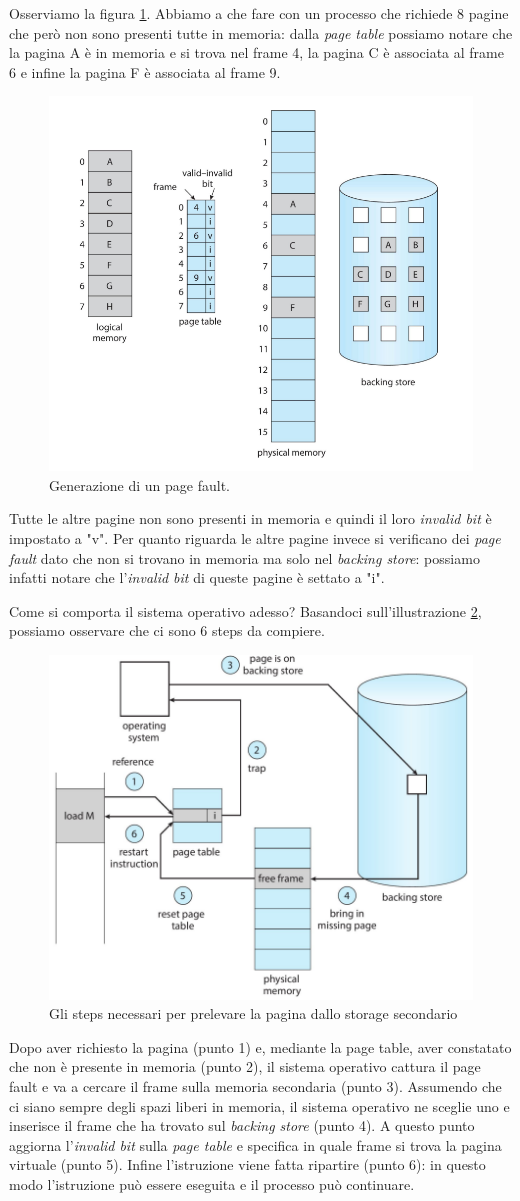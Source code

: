 Osserviamo la figura \ref{fig:page_fault}. Abbiamo a che fare con un processo che richiede 8 pagine che però non sono presenti tutte in memoria: dalla \textit{page table} possiamo notare che la pagina A è in memoria e si trova nel frame 4, la pagina C è associata al frame 6 e infine la pagina F è associata al frame 9. 
\begin{figure}[h]
    \centering
    \includegraphics[width = .50\textwidth]{../res/imgs/virtual memory/page_fault.png}
    \caption{Generazione di un page fault.}
    \label{fig:page_fault}
\end{figure}
Tutte le altre pagine non sono presenti in memoria e quindi il loro \textit{invalid bit} è impostato a "v". Per quanto riguarda le altre pagine invece si verificano dei \textit{page fault} dato che non si trovano in memoria ma solo nel \textit{backing store}: possiamo infatti notare che l'\textit{invalid bit} di queste pagine è settato a "i". 

Come si comporta il sistema operativo adesso? Basandoci sull'illustrazione \ref{fig:page_fault_handling}, possiamo osservare che ci sono 6 steps da compiere. 
\begin{figure}[h]
    \centering
    \includegraphics[width = .55 \textwidth]{../res/imgs/virtual memory/page_fault_handling.png}
    \caption{Gli steps necessari per prelevare la pagina dallo storage secondario}
    \label{fig:page_fault_handling}
\end{figure}
Dopo aver richiesto la pagina (punto 1) e, mediante la page table, aver constatato che non è presente in memoria (punto 2), il sistema operativo cattura il page fault e va a cercare il frame sulla memoria secondaria (punto 3). Assumendo che ci siano sempre degli spazi liberi in memoria, il sistema operativo ne sceglie uno e inserisce il frame che ha trovato sul \textit{backing store} (punto 4). A questo punto aggiorna l'\textit{invalid bit} sulla \textit{page table} e specifica in quale frame si trova la pagina virtuale (punto 5). Infine l'istruzione viene fatta ripartire (punto 6): in questo modo l'istruzione può essere eseguita e il processo può continuare.

